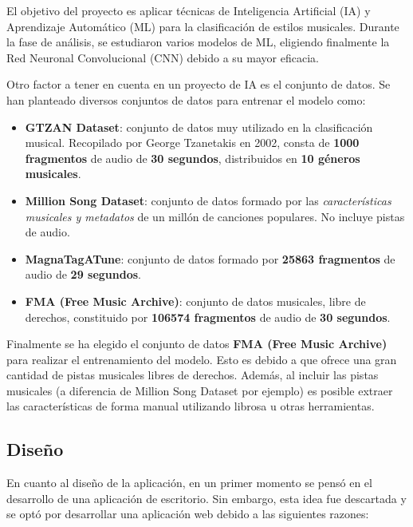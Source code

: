 El objetivo del proyecto es aplicar técnicas de Inteligencia Artificial (IA) y Aprendizaje Automático (ML) para la clasificación de estilos musicales. 
Durante la fase de análisis, se estudiaron varios modelos de ML, eligiendo finalmente la Red Neuronal Convolucional (CNN) debido a su mayor eficacia.

Otro factor a tener en cuenta en un proyecto de IA es el conjunto de datos. Se han planteado diversos conjuntos de datos para entrenar el modelo como:
\begin{itemize}

\item \textbf{GTZAN Dataset}: conjunto de datos muy utilizado en la clasificación musical. Recopilado por George Tzanetakis en 2002, consta de \textbf{1000 fragmentos} de audio de \textbf{30 segundos}, distribuidos en \textbf{10 géneros musicales}.

\item \textbf{Million Song Dataset}: conjunto de datos formado por las \textit{características musicales y metadatos} de un millón de canciones populares. No incluye pistas de audio.

\item \textbf{MagnaTagATune}: conjunto de datos formado por \textbf{25863 fragmentos} de audio de \textbf{29 segundos}.

\item \textbf{FMA (Free Music Archive)}: conjunto de datos musicales, libre de derechos, constituido por \textbf{106574 fragmentos} de audio de \textbf{30 segundos}. \cite{defferrard2017fma}

\end{itemize}

Finalmente se ha elegido el conjunto de datos \textbf{FMA (Free Music Archive)} para realizar el entrenamiento del modelo. Esto es debido a que ofrece una gran cantidad de pistas musicales libres de derechos. Además, al incluir las pistas musicales (a diferencia de Million Song Dataset por ejemplo)
es posible extraer las características de forma manual utilizando librosa u otras herramientas.

\subsection{Diseño}

En cuanto al diseño de la aplicación, en un primer momento se pensó en el desarrollo de una aplicación de escritorio. Sin embargo, esta idea fue descartada y se optó por desarrollar una aplicación web debido a las siguientes razones:

